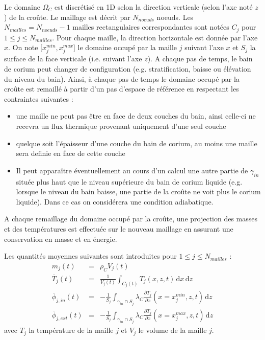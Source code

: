 \documentclass[12pt,a4paper,lmag,nt,article,french]{docDTN}
\begin{document}
Le domaine $\Omega_C$ est discrétisé en 1D selon la direction verticale (selon l'axe noté $z$) de la croûte. Le maillage est décrit par $N_{noeuds}$ noeuds. Les $N_{mailles}=N_{noeuds}-1$ mailles rectangulaires correspondantes sont notées $C_j$ pour $1 \leq j\leq N_{mailles}$. Pour chaque maille, la direction horizontale est donnée par l'axe $x$. On note [$x_j^{min}, x_j^{max}$] le domaine occupé par la maille $j$ suivant l'axe $x$ et $S_j$ la surface de la face verticale (i.e. suivant l'axe $z$). A chaque pas de temps, le bain de corium peut changer de configuration (e.g. stratification, baisse ou élévation du niveau du bain). Ainsi, à chaque pas de temps le domaine occupé par la croûte est remaillé à partir d'un pas d'espace de référence en respectant les contraintes suivantes :
\begin{itemize}
    \item une maille ne peut pas être en face de deux couches du bain, ainsi celle-ci ne recevra un flux thermique provenant uniquement d'une seul couche
    \item quelque soit l'épaisseur d'une couche du bain de corium, au moins une maille sera definie en face de cette couche
    \item  Il peut apparaître éventuellement au cours d'un calcul une autre partie de $\gamma_{in}$ située plus haut que le niveau supérieure du bain de corium liquide (e.g. lorsque le niveau du bain baisse, une partie de la croûte ne voit plus le corium liquide). Dans ce cas on considérera une condition adiabatique.
\end{itemize}
A chaque remaillage du domaine occupé par la croûte, une projection des masses et des températures est effectuée sur le nouveau maillage en assurant une conservation en masse et en énergie.

Les quantités moyennes suivantes sont introduites pour $1 \leq j\leq N_{mailles}$ :
\begin{eqnarray}
m_{j}(t) &=& \rho_C  V_j(t) \\
\overline{T}_{j}(t) &=& \frac{1}{V_j(t)} \int_{C_j(t)} T_{j}(x,z,t)\,\mathrm{d}x\, \mathrm{d}z\\
\overline{\phi}_{j,in}(t) &=& -\frac{1}{S_j}\int_{\gamma_{in}\cap S_j}\lambda_C \frac{\partial T_{j}}{\partial x}(x=x_j^{min},z,t)\, \mathrm{d}z  \label{eq:phi_j_in}\\
\overline{\phi}_{j,ext}(t) &=& -\frac{1}{S_j}\int_{\gamma_{in}\cap S_j}\lambda_C \frac{\partial T_{j}}{\partial x} (x=x_j^{max},z,t)\, \mathrm{d}z  \label{eq:phi_j_ext}
\end{eqnarray}
avec $T_{j}$ la température de la maille $j$ et $V_j$ le volume de la maille $j$.\\
\end{document}
